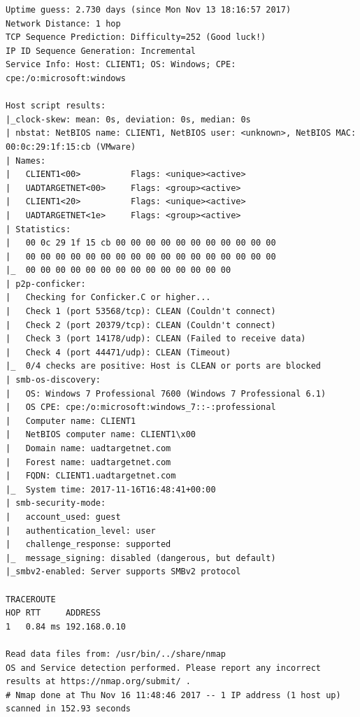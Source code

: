 \documentclass[12pt,a4paper]{article}
\begin{document}
\begin{appendices}
\begin{lstlisting}
Uptime guess: 2.730 days (since Mon Nov 13 18:16:57 2017)
Network Distance: 1 hop
TCP Sequence Prediction: Difficulty=252 (Good luck!)
IP ID Sequence Generation: Incremental
Service Info: Host: CLIENT1; OS: Windows; CPE: cpe:/o:microsoft:windows

Host script results:
|_clock-skew: mean: 0s, deviation: 0s, median: 0s
| nbstat: NetBIOS name: CLIENT1, NetBIOS user: <unknown>, NetBIOS MAC: 00:0c:29:1f:15:cb (VMware)
| Names:
|   CLIENT1<00>          Flags: <unique><active>
|   UADTARGETNET<00>     Flags: <group><active>
|   CLIENT1<20>          Flags: <unique><active>
|   UADTARGETNET<1e>     Flags: <group><active>
| Statistics:
|   00 0c 29 1f 15 cb 00 00 00 00 00 00 00 00 00 00 00
|   00 00 00 00 00 00 00 00 00 00 00 00 00 00 00 00 00
|_  00 00 00 00 00 00 00 00 00 00 00 00 00 00
| p2p-conficker:
|   Checking for Conficker.C or higher...
|   Check 1 (port 53568/tcp): CLEAN (Couldn't connect)
|   Check 2 (port 20379/tcp): CLEAN (Couldn't connect)
|   Check 3 (port 14178/udp): CLEAN (Failed to receive data)
|   Check 4 (port 44471/udp): CLEAN (Timeout)
|_  0/4 checks are positive: Host is CLEAN or ports are blocked
| smb-os-discovery:
|   OS: Windows 7 Professional 7600 (Windows 7 Professional 6.1)
|   OS CPE: cpe:/o:microsoft:windows_7::-:professional
|   Computer name: CLIENT1
|   NetBIOS computer name: CLIENT1\x00
|   Domain name: uadtargetnet.com
|   Forest name: uadtargetnet.com
|   FQDN: CLIENT1.uadtargetnet.com
|_  System time: 2017-11-16T16:48:41+00:00
| smb-security-mode:
|   account_used: guest
|   authentication_level: user
|   challenge_response: supported
|_  message_signing: disabled (dangerous, but default)
|_smbv2-enabled: Server supports SMBv2 protocol

TRACEROUTE
HOP RTT     ADDRESS
1   0.84 ms 192.168.0.10

Read data files from: /usr/bin/../share/nmap
OS and Service detection performed. Please report any incorrect results at https://nmap.org/submit/ .
# Nmap done at Thu Nov 16 11:48:46 2017 -- 1 IP address (1 host up) scanned in 152.93 seconds
		\end{lstlisting}

\end{appendices}
\end{document}
